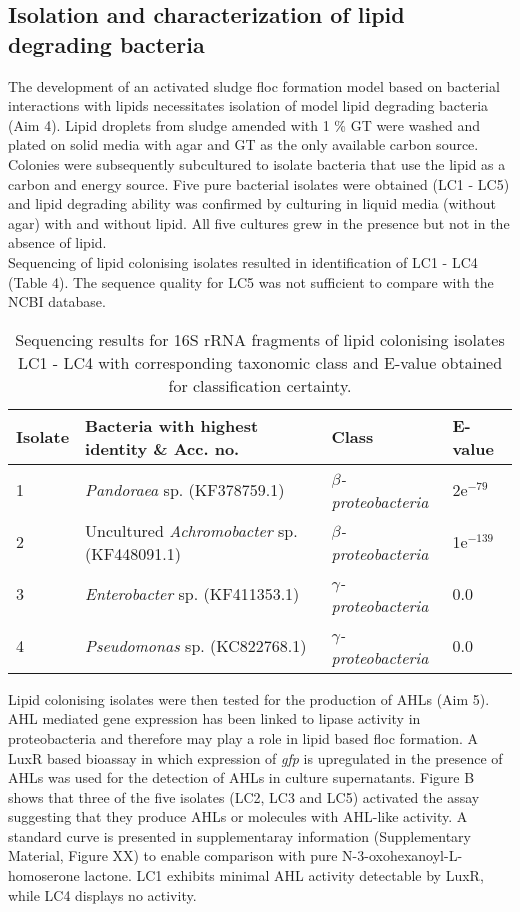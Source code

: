 \documentclass[11pt]{article}
\begin{document}
\subsection{Isolation and characterization of lipid degrading bacteria}

The development of an activated sludge floc formation model based on bacterial interactions with lipids necessitates isolation of model lipid degrading bacteria (Aim 4). Lipid droplets from sludge amended with 1 \% GT were washed and plated on solid media with agar and GT as the only available carbon source. Colonies were subsequently subcultured to isolate bacteria that use the lipid as a carbon and energy source. Five pure bacterial isolates were obtained (LC1 - LC5) and lipid degrading ability was confirmed by culturing in liquid media (without agar) with and without lipid. All five cultures grew in the presence but not in the absence of lipid. \\

Sequencing of lipid colonising isolates resulted in identification of LC1 - LC4 (Table 4). The sequence quality for LC5 was not sufficient to compare with the NCBI database.

\begin{table}
\caption{Sequencing results for 16S rRNA fragments of lipid colonising isolates LC1 - LC4 with corresponding taxonomic class and E-value obtained for classification certainty.}
\begin{tabular}{ | l | p{7.8cm} | p{3cm} | l | }
\hline
Isolate & Bacteria with highest identity \& Acc. no. & Class & E-value \\
\hline
1 &  \emph{Pandoraea} sp. (KF378759.1) & \emph{$\beta$-proteobacteria} & 2e$^{-79}$ \\
\hline
2 & Uncultured \emph{Achromobacter} sp. (KF448091.1) & \emph{$\beta$-proteobacteria} & 1e$^{-139}$ \\
\hline
3 & \emph{Enterobacter} sp. (KF411353.1) & \emph{$\gamma$-proteobacteria} & 0.0 \\
\hline
4 & \emph{Pseudomonas} sp. (KC822768.1) & \emph{$\gamma$-proteobacteria} & 0.0 \\
\hline
\end{tabular}
\end{table}



Lipid colonising isolates were then tested for the production of AHLs (Aim 5). AHL mediated gene expression has been linked to lipase activity in proteobacteria and therefore may play a role in lipid based floc formation. A LuxR based bioassay in which expression of \emph{gfp} is upregulated in the presence of AHLs was used for the detection of AHLs in culture supernatants. Figure B shows that three of the five isolates (LC2, LC3 and LC5) activated the assay suggesting that they produce AHLs or molecules with AHL-like activity. A standard curve is presented in supplementaray information (Supplementary Material, Figure XX) to enable comparison with pure N-3-oxohexanoyl-L-homoserone lactone. LC1 exhibits minimal AHL activity detectable by LuxR, while LC4 displays no activity.\\
\end{document}
